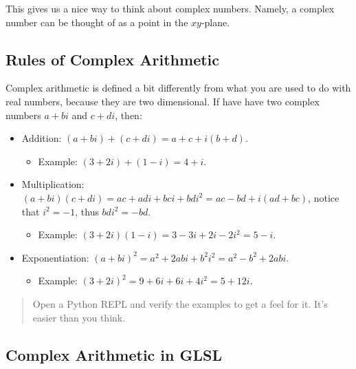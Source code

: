 \documentclass[11pt]{article}
\providecommand{\tightlist}{%
      \setlength{\itemsep}{0pt}\setlength{\parskip}{0pt}}
\begin{document}
    This gives us a nice way to think about complex numbers. Namely, a
complex number can be thought of as a point in the \(xy\)-plane.

    \hypertarget{rules-of-complex-arithmetic}{%
\subsection{Rules of Complex
Arithmetic}\label{rules-of-complex-arithmetic}}

    Complex arithmetic is defined a bit differently from what you are used
to do with real numbers, because they are two dimensional. If have have
two complex numbers \(a + bi\) and \(c + di\), then:

\begin{itemize}
\tightlist
\item
  Addition: \((a + bi) + (c + di) = a + c + i(b + d)\).

  \begin{itemize}
  \tightlist
  \item
    Example: \((3 + 2i) + (1 - i) = 4 + i\).
  \end{itemize}
\item
  Multiplication:
  \((a + bi)(c + di) = ac + adi + bci + bdi^2 = ac - bd + i(ad + bc)\),
  notice that \(i^2 = -1\), thus \(bdi^2 = - bd\).

  \begin{itemize}
  \tightlist
  \item
    Example: \((3 + 2i)(1 - i) = 3 - 3i + 2i - 2i^2 = 5 - i\).
  \end{itemize}
\item
  Exponentiation:
  \((a + bi)^2 = a^2 + 2abi + b^2i^2 = a^2 - b^2 + 2abi\).

  \begin{itemize}
  \tightlist
  \item
    Example: \((3 + 2i)^2 = 9 + 6i + 6i + 4i^2 = 5 + 12i\).
  \end{itemize}
\end{itemize}

    \begin{quote}
Open a Python REPL and verify the examples to get a feel for it. It's
easier than you think.
\end{quote}

    \hypertarget{complex-arithmetic-in-glsl}{%
\subsection{Complex Arithmetic in
GLSL}\label{complex-arithmetic-in-glsl}}
\end{document}
